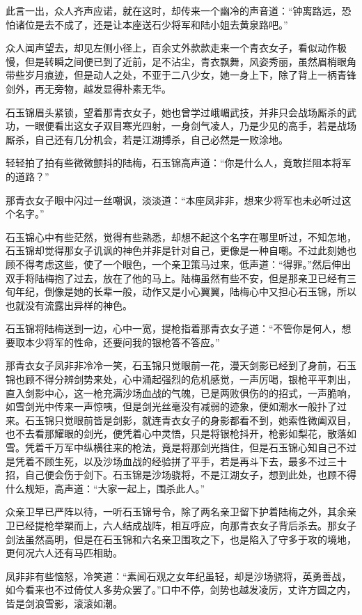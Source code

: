 此言一出，众人齐声应诺，就在这时，却传来一个幽冷的声音道：“钟离路远，恐怕诸位是去不成了，还是让本座送石少将军和陆小姐去黄泉路吧。”

众人闻声望去，却见左侧小径上，百余丈外款款走来一个青衣女子，看似动作极慢，但是转瞬之间便已到了近前，足不沾尘，青衣飘舞，风姿秀丽，虽然眉梢眼角带些岁月痕迹，但是动人之处，不亚于二八少女，她一身上下，除了背上一柄青锋剑外，再无旁物，越发显得朴素无华。

石玉锦眉头紧锁，望着那青衣女子，她也曾学过峨嵋武技，并非只会战场厮杀的武功，一眼便看出这女子双目寒光四射，一身剑气凌人，乃是少见的高手，若是战场厮杀，自己还有几分机会，若是江湖搏杀，自己必然是一败涂地。

轻轻拍了拍有些微微颤抖的陆梅，石玉锦高声道：“你是什么人，竟敢拦阻本将军的道路？”

那青衣女子眼中闪过一丝嘲讽，淡淡道：“本座凤非非，想来少将军也未必听过这个名字。”

石玉锦心中有些茫然，觉得有些熟悉，却想不起这个名字在哪里听过，不知怎地，石玉锦却觉得那女子讥讽的神色并非是针对自己，更像是一种自嘲。不过此刻她也顾不得考虑这些，使了一个眼色，一个亲卫策马过来，低声道：“得罪。”然后伸出双手将陆梅抱了过去，放在了他的马上。陆梅虽然有些不安，但是那亲卫已经有三旬年纪，倒像是她的长辈一般，动作又是小心翼翼，陆梅心中又担心石玉锦，所以也就没有流露出异样的神色。

石玉锦将陆梅送到一边，心中一宽，提枪指着那青衣女子道：“不管你是何人，想要取本少将军的性命，还要问我的银枪答不答应。”

那青衣女子凤非非冷冷一笑，石玉锦只觉眼前一花，漫天剑影已经到了身前，石玉锦也顾不得分辨剑势来处，心中涌起强烈的危机感觉，一声厉喝，银枪平平刺出，直入剑影中心，这一枪充满沙场血战的气魄，已是两败俱伤的的招式，一声脆响，如雪剑光中传来一声惊咦，但是剑光丝毫没有减弱的迹象，便如潮水一般扑了过来。石玉锦只觉眼前皆是剑影，就连青衣女子的身影都看不到，她索性微阖双目，也不去看那耀眼的剑光，便凭着心中灵悟，只是将银枪抖开，枪影如梨花，散落如雪。凭着千万军中纵横往来的枪法，竟是将那剑光挡住，但是石玉锦心知自己不过是凭着不顾生死，以及沙场血战的经验拼了平手，若是再斗下去，最多不过三十招，自己便会伤于剑下。石玉锦是沙场骁将，不是江湖女子，想到此处，也顾不得什么规矩，高声道：“大家一起上，围杀此人。”

众亲卫早已严阵以待，一听石玉锦号令，除了两名亲卫留下护着陆梅之外，其余亲卫已经提枪举槊而上，六人结成战阵，相互呼应，向那青衣女子背后杀去。那女子剑法虽然高明，但是在石玉锦和六名亲卫围攻之下，也是陷入了守多于攻的境地，更何况六人还有马匹相助。

凤非非有些恼怒，冷笑道：“素闻石观之女年纪虽轻，却是沙场骁将，英勇善战，如今看来也不过倚仗人多势众罢了。”口中不停，剑势也越发凌厉，丈许方圆之内，皆是剑浪雪影，滚滚如潮。

